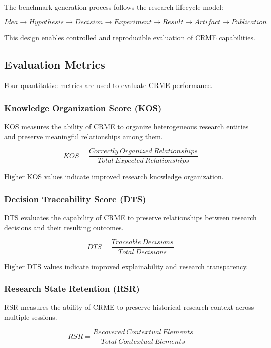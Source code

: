 The benchmark generation process follows the research lifecycle model:

\[
Idea
\rightarrow
Hypothesis
\rightarrow
Decision
\rightarrow
Experiment
\rightarrow
Result
\rightarrow
Artifact
\rightarrow
Publication
\]


This design enables controlled and reproducible evaluation of CRME capabilities.



\subsection{Evaluation Metrics}

Four quantitative metrics are used to evaluate CRME performance.


\subsubsection{Knowledge Organization Score (KOS)}

KOS measures the ability of CRME to organize heterogeneous research entities and preserve meaningful relationships among them.

\[
KOS =
\frac{Correctly\ Organized\ Relationships}
{Total\ Expected\ Relationships}
\]


Higher KOS values indicate improved research knowledge organization.



\subsubsection{Decision Traceability Score (DTS)}

DTS evaluates the capability of CRME to preserve relationships between research decisions and their resulting outcomes.

\[
DTS =
\frac{Traceable\ Decisions}
{Total\ Decisions}
\]


Higher DTS values indicate improved explainability and research transparency.



\subsubsection{Research State Retention (RSR)}

RSR measures the ability of CRME to preserve historical research context across multiple sessions.

\[
RSR =
\frac{Recovered\ Contextual\ Elements}
{Total\ Contextual\ Elements}
\]



